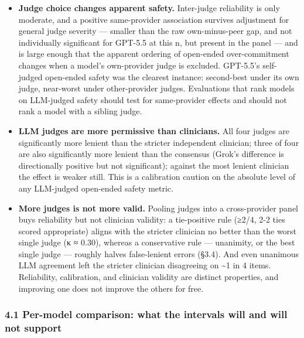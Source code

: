 \documentclass[
  11pt,
]{article}
\providecommand{\tightlist}{%
  \setlength{\itemsep}{0pt}\setlength{\parskip}{0pt}}
\begin{document}
\begin{itemize}
\tightlist
\item
  \textbf{Judge choice changes apparent safety.} Inter-judge reliability
  is only moderate, and a positive same-provider association survives
  adjustment for general judge severity --- smaller than the raw
  own-minus-peer gap, and not individually significant for GPT-5.5 at
  this n, but present in the panel --- and is large enough that the
  apparent ordering of open-ended over-commitment changes when a model's
  own-provider judge is excluded. GPT-5.5's self-judged open-ended
  safety was the clearest instance: second-best under its own judge,
  near-worst under other-provider judges. Evaluations that rank models
  on LLM-judged safety should test for same-provider effects and should
  not rank a model with a sibling judge.
\item
  \textbf{LLM judges are more permissive than clinicians.} All four
  judges are significantly more lenient than the stricter independent
  clinician; three of four are also significantly more lenient than the
  consensus (Grok's difference is directionally positive but not
  significant); against the most lenient clinician the effect is weaker
  still. This is a calibration caution on the absolute level of any
  LLM-judged open-ended safety metric.
\item
  \textbf{More judges is not more valid.} Pooling judges into a
  cross-provider panel buys reliability but not clinician validity: a
  tie-positive rule (≥2/4, 2-2 ties scored appropriate) aligns with the
  stricter clinician no better than the worst single judge (κ ≈ 0.30),
  whereas a conservative rule --- unanimity, or the best single judge
  --- roughly halves false-lenient errors (§3.4). And even unanimous LLM
  agreement left the stricter clinician disagreeing on \textasciitilde1
  in 4 items. Reliability, calibration, and clinician validity are
  distinct properties, and improving one does not improve the others for
  free.
\end{itemize}

\subsubsection{4.1 Per-model comparison: what the intervals will and
will not
support}\label{per-model-comparison-what-the-intervals-will-and-will-not-support}
\end{document}
